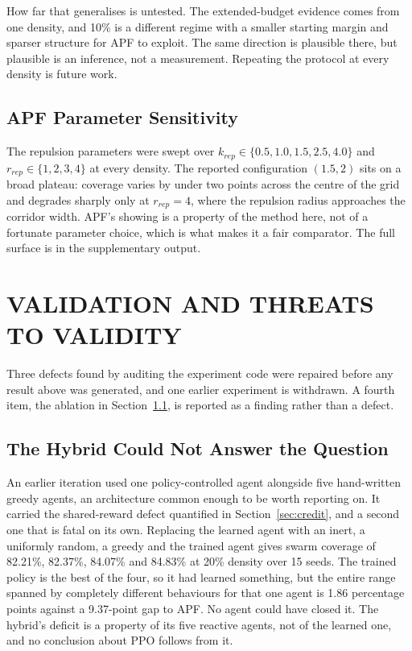 \documentclass[a4paper, 10pt, conference]{ieeeconf}
\begin{document}
How far that generalises is untested. The extended-budget evidence
comes from one density, and 10\% is a different regime with a smaller
starting margin and sparser structure for APF to exploit. The same
direction is plausible there, but plausible is an inference, not a
measurement. Repeating the protocol at every density is future work.

\subsection{APF Parameter Sensitivity}\label{sec:sweep}

The repulsion parameters were swept over $k_{rep} \in \{0.5, 1.0,
1.5, 2.5, 4.0\}$ and $r_{rep} \in \{1,2,3,4\}$ at every density. The
reported configuration $(1.5, 2)$ sits on a broad plateau: coverage
varies by under two points across the centre of the grid and degrades
sharply only at $r_{rep}=4$, where the repulsion radius approaches the
corridor width. APF's showing is a property of the method here, not of
a fortunate parameter choice, which is what makes it a fair
comparator. The full surface is in the supplementary output.

\section{VALIDATION AND THREATS TO VALIDITY}\label{sec:validity}

Three defects found by auditing the experiment code were repaired
before any result above was generated, and one earlier experiment is
withdrawn. A fourth item, the ablation in
Section~\ref{sec:hybrid_ablation}, is reported as a finding rather
than a defect.

\subsection{The Hybrid Could Not Answer the Question}
\label{sec:hybrid_ablation}

An earlier iteration used one policy-controlled agent alongside five
hand-written greedy agents, an architecture common enough to be worth
reporting on. It carried the shared-reward defect quantified in
Section~\ref{sec:credit}, and a second one that is fatal on its own.
Replacing the learned agent with an inert, a uniformly random, a
greedy and the trained agent gives swarm coverage of 82.21\%, 82.37\%,
84.07\% and 84.83\% at 20\% density over 15 seeds. The trained policy
is the best of the four, so it had learned something, but the entire
range spanned by completely different behaviours for that one agent is
1.86 percentage points against a 9.37-point gap to APF. No agent could
have closed it. The hybrid's deficit is a property of its five
reactive agents, not of the learned one, and no conclusion about PPO
follows from it.
\end{document}
